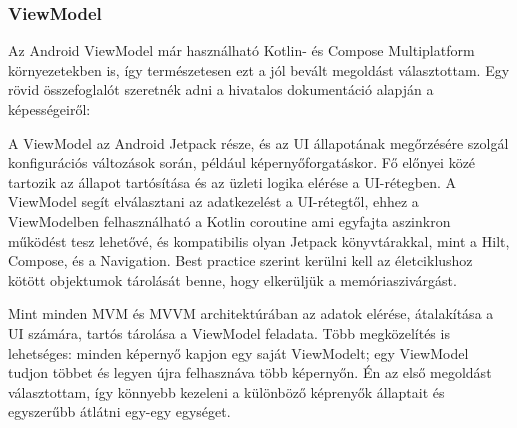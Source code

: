 \subsubsection{ViewModel}
\label{sec:ViewModel}

Az Android ViewModel már használható Kotlin- és Compose Multiplatform környezetekben is\cite{ViewModelKMP}, így természetesen ezt a jól bevált megoldást választottam.
Egy rövid összefoglalót szeretnék adni a hivatalos dokumentáció alapján a képességeiről:\cite{ViewModelAndroid}

A ViewModel az Android Jetpack része, és az UI állapotának megőrzésére szolgál konfigurációs változások során, például képernyőforgatáskor.  Fő előnyei közé tartozik az állapot tartósítása és az üzleti logika elérése a UI-rétegben. A ViewModel segít elválasztani az adatkezelést a UI-rétegtől, ehhez a ViewModelben felhasználható a Kotlin coroutine ami egyfajta aszinkron működést tesz lehetővé, és kompatibilis olyan Jetpack könyvtárakkal, mint a Hilt, Compose, és a Navigation. Best practice szerint kerülni kell az életciklushoz kötött objektumok tárolását benne, hogy elkerüljük a memóriaszivárgást. 

Mint minden MVM és MVVM architektúrában az adatok elérése, átalakítása a UI számára, tartós tárolása a ViewModel feladata.
Több megközelítés is lehetséges: minden képernyő kapjon egy saját ViewModelt; egy ViewModel tudjon többet és legyen újra felhasznáva több képernyőn.
Én az első megoldást választottam, így könnyebb kezeleni a különböző képrenyők állaptait és egyszerűbb átlátni egy-egy egységet.

